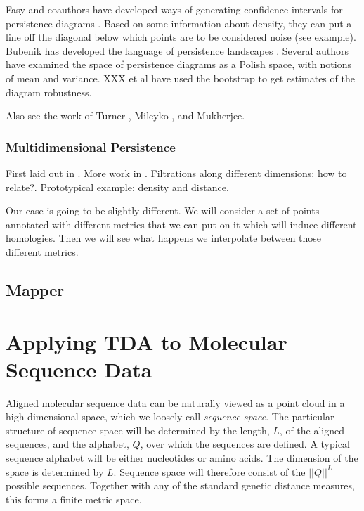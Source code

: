 Fasy and coauthors have developed ways of generating confidence intervals for persistence diagrams \citep{Fasy:2014}.
Based on some information about density, they can put a line off the diagonal below which points are to be considered noise (see example).
Bubenik has developed the language of persistence landscapes \cite{Bubenik:2007ux,Bubenik2015:um}.  
Several authors have examined the space of persistence diagrams as a Polish space, with notions of mean and variance.
XXX et al have used the bootstrap to get estimates of the diagram robustness.

Also see the work of Turner \cite{Turner:2012wb}, Mileyko \cite{Mileyko:2011jm}, and Mukherjee.

\subsubsection{Multidimensional Persistence}
\label{bg:tda:ph:multid}

First laid out in \cite{Carlsson:2009b}.
More work in \cite{Lesnick:2012uv}.
Filtrations along different dimensions; how to relate?.
Prototypical example: density and distance.

Our case is going to be slightly different.
We will consider a set of points annotated with different metrics that we can put on it which will induce different homologies.
Then we will see what happens we interpolate between those different metrics.

\subsection{Mapper}
\label{bg:tda:mapper}


\section{Applying TDA to Molecular Sequence Data}
\label{bg:top4bio}

Aligned molecular sequence data can be naturally viewed as a point cloud in a high-dimensional space, which we loosely call \emph{sequence space}.
The particular structure of sequence space will be determined by the length, $L$, of the aligned sequences, and the alphabet, $Q$, over which the sequences are defined.
A typical sequence alphabet will be either nucleotides or amino acids.
The dimension of the space is determined by $L$.
Sequence space will therefore consist of the $||Q||^L$ possible sequences.
Together with any of the standard genetic distance measures, this forms a finite metric space.

